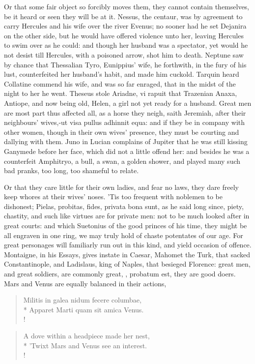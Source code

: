 Or that some fair object so forcibly moves them, they cannot contain
themselves, be it heard or seen they will be at it. Nessus, the
centaur, was by agreement to carry Hercules and his wife over the river
Evenus; no sooner had he set Dejanira on the other side, but he would
have offered violence unto her, leaving Hercules to swim over as he
could: and though her husband was a spectator, yet would he not desist
till Hercules, with a poisoned arrow, shot him to death. Neptune
saw by chance that Thessalian Tyro, Eunippius' wife, he forthwith, in
the fury of his lust, counterfeited her husband's habit, and made him
cuckold. Tarquin heard Collatine commend his wife, and was so far
enraged, that in the midst of the night to her he went. Theseus
stole Ariadne, vi rapuit that Trazenian Anaxa, Antiope, and now being
old, Helen, a girl not yet ready for a husband. Great men are most part
thus affected all, as a horse they neigh, saith Jeremiah, after
their neighbours' wives,-ut visa pullus adhinnit equa: and if they be
in company with other women, though in their own wives' presence, they
must be courting and dallying with them. Juno in Lucian complains of
Jupiter that he was still kissing Ganymede before her face, which did
not a little offend her: and besides he was a counterfeit Amphitryo, a
bull, a swan, a golden shower, and played many such bad pranks, too
long, too shameful to relate.

Or that they care little for their own ladies, and fear no laws, they
dare freely keep whores at their wives' noses. 'Tis too frequent with
noblemen to be dishonest; Pielas, probitas, fides, privata bona sunt,
as he said long since, piety, chastity, and such like virtues are
for private men: not to be much looked after in great courts: and which
Suetonius of the good princes of his time, they might be all engraven
in one ring, we may truly hold of chaste potentates of our age. For
great personages will familiarly run out in this kind, and yield
occasion of offence.  Montaigne, in his Essays, gives instate in
Caesar, Mahomet the Turk, that sacked Constantinople, and Ladislaus,
king of Naples, that besieged Florence: great men, and great soldiers,
are commonly great, \etc{}, probatum est, they are good doers. Mars and
Venus are equally balanced in their actions,
%
\begin{latin}%
\begin{verse}%
Militis in galea nidum fecere columbae,\\*
Apparet Marti quam sit amica Venus.\\!
\end{verse}%
\end{latin}%
\translationrule%
\begin{verse}%
A dove within a headpiece made her nest,\\*
'Twixt Mars and Venus see an interest.\\!
\end{verse}%
%

